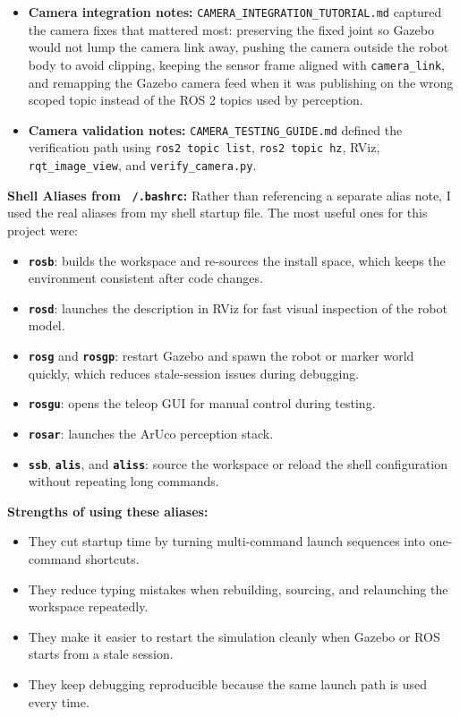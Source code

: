\documentclass[12pt,a4paper]{article}
\begin{document}
\begin{itemize}[leftmargin=*]
    \item \textbf{Camera integration notes:} \texttt{CAMERA\_INTEGRATION\_TUTORIAL.md} captured the camera fixes that mattered most: preserving the fixed joint so Gazebo would not lump the camera link away, pushing the camera outside the robot body to avoid clipping, keeping the sensor frame aligned with \texttt{camera\_link}, and remapping the Gazebo camera feed when it was publishing on the wrong scoped topic instead of the ROS 2 topics used by perception.
    \item \textbf{Camera validation notes:} \texttt{CAMERA\_TESTING\_GUIDE.md} defined the verification path using \texttt{ros2 topic list}, \texttt{ros2 topic hz}, RViz, \texttt{rqt\_image\_view}, and \texttt{verify\_camera.py}.
\end{itemize}

\textbf{Shell Aliases from \texttt{\string~/.bashrc}:}
Rather than referencing a separate alias note, I used the real aliases from my shell startup file. The most useful ones for this project were:

\begin{itemize}[leftmargin=*]
    \item \textbf{\texttt{rosb}}: builds the workspace and re-sources the install space, which keeps the environment consistent after code changes.
    \item \textbf{\texttt{rosd}}: launches the description in RViz for fast visual inspection of the robot model.
    \item \textbf{\texttt{rosg}} and \textbf{\texttt{rosgp}}: restart Gazebo and spawn the robot or marker world quickly, which reduces stale-session issues during debugging.
    \item \textbf{\texttt{rosgu}}: opens the teleop GUI for manual control during testing.
    \item \textbf{\texttt{rosar}}: launches the ArUco perception stack.
    \item \textbf{\texttt{ssb}}, \textbf{\texttt{alis}}, and \textbf{\texttt{aliss}}: source the workspace or reload the shell configuration without repeating long commands.
\end{itemize}

\textbf{Strengths of using these aliases:}
\begin{itemize}[leftmargin=*]
    \item They cut startup time by turning multi-command launch sequences into one-command shortcuts.
    \item They reduce typing mistakes when rebuilding, sourcing, and relaunching the workspace repeatedly.
    \item They make it easier to restart the simulation cleanly when Gazebo or ROS starts from a stale session.
    \item They keep debugging reproducible because the same launch path is used every time.
\end{itemize}
\end{document}
